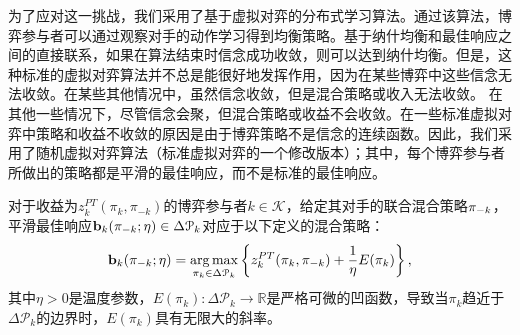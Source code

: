 为了应对这一挑战，我们采用了基于虚拟对弈的分布式学习算法。通过该算法，博弈参与者可以通过观察对手的动作学习得到均衡策略。基于纳什均衡和最佳响应之间的直接联系，如果在算法结束时信念成功收敛，则可以达到纳什均衡。但是，这种标准的虚拟对弈算法并不总是能很好地发挥作用，因为在某些博弈中这些信念无法收敛。在某些其他情况中，虽然信念收敛，但是混合策略或收入无法收敛。
在其他一些情况下，尽管信念会聚，但混合策略或收益不会收敛。在一些标准虚拟对弈中策略和收益不收敛的原因是由于博弈策略不是信念的连续函数。因此，我们采用了随机虚拟对弈算法（标准虚拟对弈的一个修改版本）；其中，每个博弈参与者所做出的策略都是平滑的最佳响应，而不是标准的最佳响应。

\begin{df}[平滑最佳响应]
对于收益为$z^{PT}_k(\pi_k,\pi_{-k})$的博弈参与者$k\in\mathcal{K}$，给定其对手的联合混合策略$\pi_{-k}$，平滑最佳响应$\bold{b}_k(\pi_{-k};\eta)\in\Delta\mathcal{P}_k$对应于以下定义的混合策略：
\begin{equation}\label{sbr0}
\bold{b}_k(\pi_{-k};\eta)=\underset{\pi_k\in\Delta\mathcal{P}_k}{\arg\max}\left\{z_k^{PT}(\pi_k,\pi_{-k})+\frac{1}{\eta}E(\pi_k)\right\},
\end{equation}
其中$\eta>0$是温度参数，$E(\pi_k):\Delta\mathcal{P}_k\rightarrow \mathbb{R}$是严格可微的凹函数，导致当$\pi_k$趋近于$\Delta\mathcal{P}_k$的边界时，$E(\pi_k)$具有无限大的斜率。
\end{df}

